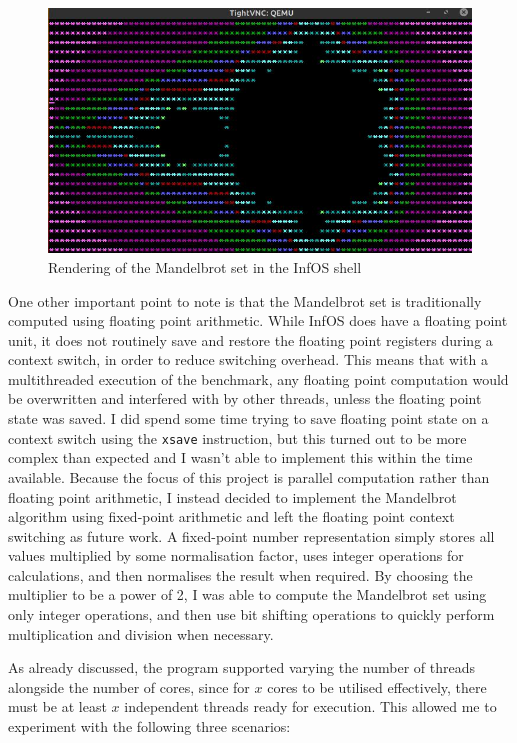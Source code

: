 \documentclass[bsc,frontabs,singlespacing,parskip,deptreport]{infthesis}
\begin{document}
\begin{figure}[h!]
    \centering
    \includegraphics[scale=0.8]{figures/terminal-output.jpg}
    \caption{Rendering of the Mandelbrot set in the InfOS shell}
    \label{terminal-output}
\end{figure}

One other important point to note is that the Mandelbrot set is traditionally computed using floating point arithmetic. While InfOS does have a floating point unit, it does not routinely save and restore the floating point registers during a context switch, in order to reduce switching overhead. This means that with a multithreaded execution of the benchmark, any floating point computation would be overwritten and interfered with by other threads, unless the floating point state was saved. I did spend some time trying to save floating point state on a context switch using the \verb|xsave| instruction, but this turned out to be more complex than expected and I wasn't able to implement this within the time available. Because the focus of this project is parallel computation rather than floating point arithmetic, I instead decided to implement the Mandelbrot algorithm using fixed-point arithmetic and left the floating point context switching as future work. A fixed-point number representation simply stores all values multiplied by some normalisation factor, uses integer operations for calculations, and then normalises the result when required. By choosing the multiplier to be a power of 2, I was able to compute the Mandelbrot set using only integer operations, and then use bit shifting operations to quickly perform multiplication and division when necessary.

As already discussed, the program supported varying the number of threads alongside the number of cores, since for $x$ cores to be utilised effectively, there must be at least $x$ independent threads ready for execution. This allowed me to experiment with the following three scenarios:
\end{document}
